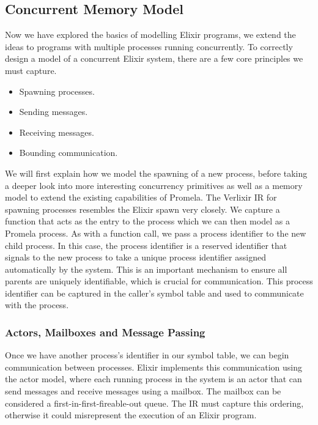 \subsection{Concurrent Memory Model} \label{sec:memory_model}
Now we have explored the basics of modelling Elixir programs, we extend the ideas to programs with multiple processes running concurrently. To correctly design a model of a concurrent Elixir system, there are a few core principles we must capture.
\begin{itemize}
    \item Spawning processes.
    \item Sending messages.
    \item Receiving messages.
    \item Bounding communication.
\end{itemize}
We will first explain how we model the spawning of a new process, before taking a deeper look into more interesting concurrency primitives as well as a memory model to extend the existing capabilities of Promela. The Verlixir IR for spawning processes resembles the Elixir spawn very closely. We capture a function that acts as the entry to the process which we can then model as a Promela process. As with a function call, we pass a process identifier to the new child process. In this case, the process identifier is a reserved identifier that signals to the new process to take a unique process identifier assigned automatically by the system. This is an important mechanism to ensure all parents are uniquely identifiable, which is crucial for communication. This process identifier can be captured in the caller's symbol table and used to communicate with the process.
\par

\subsubsection{Actors, Mailboxes and Message Passing}
Once we have another process's identifier in our symbol table, we can begin communication between processes. Elixir implements this communication using the actor model, where each running process in the system is an actor that can send messages and receive messages using a mailbox. The mailbox can be considered a first-in-first-fireable-out queue. The IR must capture this ordering, otherwise it could misrepresent the execution of an Elixir program.
\par
